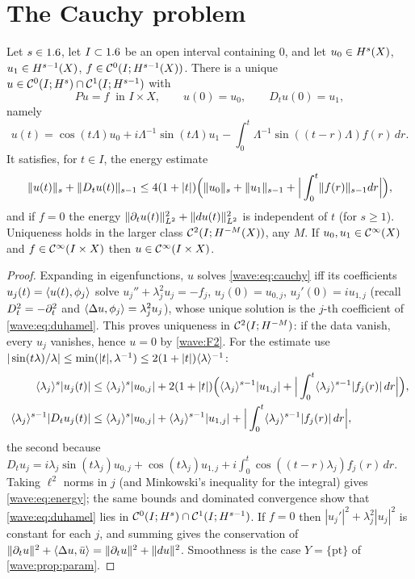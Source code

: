 \section{The Cauchy problem}\label{wave:sec:cauchy}

\begin{theorem}\label{wave:thm:cauchy}
Let $s\in1.6$, let $I\subset1.6$ be an open interval containing $0$, and let
$u_0\in H^{s}(X)$, $u_1\in H^{s-1}(X)$, $f\in\mathcal{C}^0(I;H^{s-1}(X))$. There is a
unique $u\in\mathcal{C}^0(I;H^{s})\cap\mathcal C^1(I;H^{s-1})$ with
\begin{equation}\label{wave:eq:cauchy}
Pu=f\ \text{ in }I\times X,\qquad u(0)=u_0,\qquad D_tu(0)=u_1,
\end{equation}
namely
\begin{equation}\label{wave:eq:duhamel}
u(t)=\cos(t\Lambda)u_0+i\Lambda^{-1}\sin(t\Lambda)u_1-\int_0^t\Lambda^{-1}\sin((t-r)\Lambda)f(r)\,dr .
\end{equation}
It satisfies, for $t\in I$, the energy estimate
\begin{equation}\label{wave:eq:energy}
\lVert u(t)\rVert_s+\lVert D_tu(t)\rVert_{s-1}\le 4(1+|t|)\Big(\lVert u_0\rVert_s+\lVert u_1\rVert_{s-1}
+\Big|\int_0^t\lVert f(r)\rVert_{s-1}dr\Big|\Big),
\end{equation}
and if $f=0$ the energy $\lVert \partial_tu(t)\rVert^2_{L^2}+\lVert du(t)\rVert^2_{L^2}$ is
independent of $t$ (for $s\ge1$). Uniqueness holds in the larger class
$\mathcal C^2(I;H^{-M}(X))$, any $M$. If $u_0,u_1\in\mathcal{C}^\infty(X)$ and
$f\in\mathcal{C}^\infty(I\times X)$ then $u\in\mathcal{C}^\infty(I\times X)$.
\end{theorem}
\begin{proof}
Expanding in eigenfunctions, $u$ solves \eqref{wave:eq:cauchy} iff its
coefficients $u_j(t)=\langle u(t), \phi_j\rangle$ solve
$u_j''+\lambda_j^2u_j=-f_j$, $u_j(0)=u_{0,j}$, $u_j'(0)=iu_{1,j}$ (recall
$D_t^2=-\partial_t^2$ and $\langle \Delta u, \phi_j\rangle=\lambda_j^2u_j$), whose unique
solution is the $j$-th coefficient of \eqref{wave:eq:duhamel}. This proves
uniqueness in $\mathcal C^2(I;H^{-M})$: if the data vanish, every $u_j$
vanishes, hence $u=0$ by \ref{wave:F2}. For the estimate use
$|\sin(t\lambda)/\lambda|\le\min(|t|,\lambda^{-1})\le2(1+|t|)\langle \lambda\rangle^{-1}$:
\begin{align*}
\langle \lambda_j\rangle^s|u_j(t)|&\le\langle \lambda_j\rangle^s|u_{0,j}|+2(1+|t|)\Big(\langle \lambda_j\rangle^{s-1}|u_{1,j}|
+\Big|\int_0^t\langle \lambda_j\rangle^{s-1}|f_j(r)|\,dr\Big|\Big),\\
\langle \lambda_j\rangle^{s-1}|D_tu_j(t)|&\le\langle \lambda_j\rangle^s|u_{0,j}|+\langle \lambda_j\rangle^{s-1}|u_{1,j}|
+\Big|\int_0^t\langle \lambda_j\rangle^{s-1}|f_j(r)|\,dr\Big|,
\end{align*}
the second because $D_tu_j=i\lambda_j\sin(t\lambda_j)u_{0,j}+\cos(t\lambda_j)u_{1,j}
+i\int_0^t\cos((t-r)\lambda_j)f_j(r)\,dr$. Taking $\ell^2$ norms in $j$ (and
Minkowski's inequality for the integral) gives \eqref{wave:eq:energy}; the same
bounds and dominated convergence show that \eqref{wave:eq:duhamel} lies in
$\mathcal{C}^0(I;H^{s})\cap\mathcal C^1(I;H^{s-1})$. If $f=0$ then
$|u_j'|^2+\lambda_j^2|u_j|^2$ is constant for each $j$, and summing gives the
conservation of $\lVert \partial_tu\rVert^2+\langle \Delta u, \bar u\rangle=\lVert \partial_tu\rVert^2+\lVert du\rVert^2$.
Smoothness is the case $Y=\{\mathrm{pt}\}$ of \cref{wave:prop:param}.
\end{proof}

